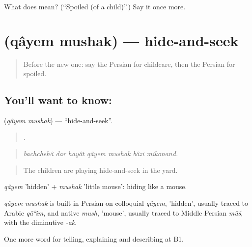 \begin{tcolorbox}[breakable,colback=teal!4,colframe=teal!35!black,title={Before you move on}]
What does  mean? (\textquotedblleft{}Spoiled (of a child)\textquotedblright{}.) Say it once more.
\end{tcolorbox}
\section[\texorpdfstring{\fa{قایم} \fa{موشک} (qâyem mushak)}{قایم موشک (qâyem mushak)}]{  (qâyem mushak) — hide-and-seek}

\label{lesson:FA-C503-qayem-mushak}



\begin{quote}
Before the new one: say the Persian for childcare, then the Persian for spoiled.
\end{quote}

\subsection*{You'll want to know:  }
\textbf{ } (\emph{qâyem mushak}) — \textquotedblleft{}hide-and-seek\textquotedblright{}.

\begin{quote}
       .
\end{quote}

\begin{quote}
\emph{bachchehâ dar hayât qâyem mushak bâzi mikonand.}
\end{quote}

\begin{quote}
The children are playing hide-and-seek in the yard.
\end{quote}

\emph{qâyem} 'hidden' + \emph{mushak} 'little mouse': hiding like a mouse.

\begin{cousinweb}
\emph{qâyem mushak} is built in Persian on colloquial \emph{qâyem}, 'hidden', usually traced to Arabic \emph{qāʾim}, and native \emph{mush}, 'mouse', usually traced to Middle Persian \emph{mūš}, with the diminutive \emph{-ak}.
\end{cousinweb}

\begin{grammarlens}[title={What you've built}]
One more word for telling, explaining and describing at B1.
\end{grammarlens}

